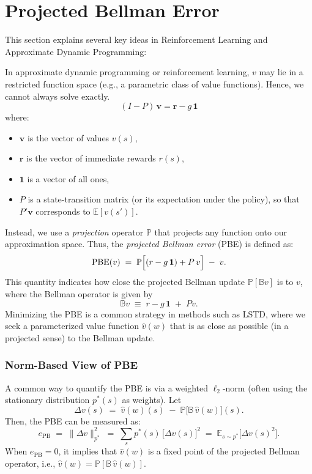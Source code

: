 \section{Projected Bellman Error}
\label{sec:bellman_error}

This section explains several key ideas in Reinforcement Learning and Approximate Dynamic Programming:


In approximate dynamic programming or reinforcement learning, $v$ may lie in a restricted function space (e.g., a parametric class of value functions). Hence, we cannot always solve exactly.
\[
(I - P)\,\boldsymbol{v} = \boldsymbol{r} - g\,\mathbf{1}
\]
\noindent
where:
\begin{itemize}
    \item $\boldsymbol{v}$ is the vector of values $v(s)$,
    \item $\boldsymbol{r}$ is the vector of immediate rewards $r(s)$,
    \item $\mathbf{1}$ is a vector of all ones,
    \item $P$ is a state-transition matrix (or its expectation under the policy), so that $P'\boldsymbol{v}$ corresponds to $\mathbb{E}[v(s')]$.
\end{itemize}

Instead, we use a \emph{projection} operator $\mathbb{P}$ that projects any function onto our approximation space. Thus, the \emph{projected Bellman error} (PBE) is defined as:
\[
\text{PBE}(v) 
\;=\; \mathbb{P}\Bigl[(r - g\,\mathbf{1}) + P\,v\Bigr] \;-\; v.
\]
This quantity indicates how close the projected Bellman update $\mathbb{P}[\mathbb{B}v]$ is to $v$, where the Bellman operator is given by
\[
\mathbb{B}v \;\equiv\; r - g\,\mathbf{1} \;+\; Pv.
\]
Minimizing the PBE is a common strategy in methods such as LSTD, where we seek a parameterized value function $\hat{v}(w)$ that is as close as possible (in a projected sense) to the Bellman update.

\subsubsection{Norm-Based View of PBE}
A common way to quantify the PBE is via a weighted $\ell_2$-norm (often using the stationary distribution $p^*(s)$ as weights). Let
\[
\Delta v(s) \;=\; \hat{v}(w)(s) \;-\; \mathbb{P}\bigl[\mathbb{B}\,\hat{v}(w)\bigr](s).
\]
Then, the PBE can be measured as:
\[
e_{\mathrm{PB}}
\;=\;
\bigl\lVert \Delta v \bigr\rVert_{p^*}^2
\;=\;
\sum_{s} p^*(s)\,\bigl[\Delta v(s)\bigr]^2
\;=\;
\mathbb{E}_{s \sim p^*}\bigl[\Delta v(s)^2\bigr].
\]
When $e_{\mathrm{PB}} = 0$, it implies that $\hat{v}(w)$ is a fixed point of the projected Bellman operator, i.e., $\hat{v}(w) = \mathbb{P}[\mathbb{B}\,\hat{v}(w)]$.

